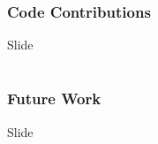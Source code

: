 \documentclass[hyphens,aspectratio=169]{beamer}
\begin{document}
\part{}
\section{Code Contributions}

\begin{frame}[fragile]{Slide}
\end{frame}

\part{}
\section{Future Work}

\begin{frame}[fragile]{Slide}
\end{frame}
\end{document}
